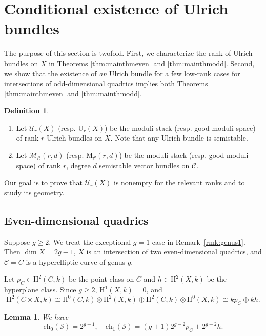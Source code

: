 \documentclass[12pt, letterpaper]{amsart}
\newtheorem{lemma}[theorem]{Lemma}
\theoremstyle{definition}
\newtheorem{definition}[theorem]{Definition}
\newcommand{\cC}{\mathcal{C} }
\newcommand{\cM}{\mathcal{M} }
\newcommand{\cS}{\mathcal{S} }
\newcommand{\cU}{\mathcal{U} }
\newcommand{\rH}{\mathrm{H} }
\newcommand{\rM}{\mathrm{M} }
\newcommand{\rU}{\mathrm{U} }
\def\ch{\mathrm{ch}}
\begin{document}
\section{Conditional existence of Ulrich bundles}\label{sec:existenceUlrich}

The purpose of this section is twofold. First, we characterize the rank of Ulrich bundles on \(X\) in Theorems \ref{thm:mainthmeven} and \ref{thm:mainthmodd}. Second, we show that the existence of \textit{an} Ulrich bundle for a few low-rank cases for intersections of odd-dimensional quadrics implies both Theorems \ref{thm:mainthmeven} and \ref{thm:mainthmodd}.

\begin{definition}\label{def:modulispace}
\begin{enumerate}
  \item Let \(\cU_r(X)\) (resp. \(\rU_r(X)\)) be the moduli stack (resp. good moduli space) of rank \(r\) Ulrich bundles on \(X\). Note that any Ulrich bundle is semistable.
  \item Let \(\cM_\cC(r, d)\) (resp. \(\rM_\cC(r, d)\)) be the moduli stack (resp. good moduli space) of rank \(r\), degree \(d\) semistable vector bundles on \(\cC\).
\end{enumerate}
\end{definition}

Our goal is to prove that \(\cU_r(X)\) is nonempty for the relevant ranks and to study its geometry.

\subsection{Even-dimensional quadrics}\label{ssec:evenRaynaud}

Suppose \(g\ge2\). We treat the exceptional \(g = 1\) case in Remark~\ref{rmk:genus1}. Then \(\dim X=2g-1\), \(X\) is an intersection of two even-dimensional quadrics, and \(\cC=C\) is a hyperelliptic curve of genus \(g\).

Let \(p_C \in \rH^2(C, k)\) be the point class on \(C\) and \(h\in \rH^2(X, k)\) be the hyperplane class. Since \(g \ge 2\), \(\rH^1(X, k) = 0\), and
\[\rH^2(C \times X, k) \cong \rH^0(C, k) \otimes \rH^2(X, k) \oplus \rH^2(C, k) \otimes \rH^0(X, k) \cong k p_C \oplus k h.\]

\begin{lemma}\label{lem:chofShat}
We have
\[\ch_0(\cS) = 2^{g-1},\quad\ch_1(\cS) = (g+1)2^{g-2}p_C + 2^{g-2}h.\]
\end{lemma}
\end{document}
